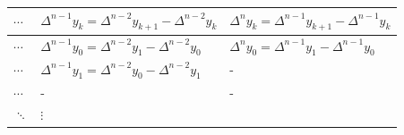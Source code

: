 \documentclass[]{book}
\begin{document}
\begin{longtable}[]{@{}lll@{}}
\toprule
\begin{minipage}[b]{0.07\columnwidth}\raggedright
\(\cdots\)\strut
\end{minipage} & \begin{minipage}[b]{0.43\columnwidth}\raggedright
\(\Delta^{n-1} y_k = \Delta^{n-2} y_{k+1} - \Delta^{n-2} y_k\)\strut
\end{minipage} & \begin{minipage}[b]{0.41\columnwidth}\raggedright
\(\Delta^{n} y_k = \Delta^{n-1} y_{k+1} - \Delta^{n-1} y_k\)\strut
\end{minipage}\tabularnewline
\midrule
\endhead
\begin{minipage}[t]{0.07\columnwidth}\raggedright
\(\cdots\)\strut
\end{minipage} & \begin{minipage}[t]{0.43\columnwidth}\raggedright
\(\Delta^{n-1} y_0 = \Delta^{n-2} y_{1} - \Delta^{n-2} y_0\)\strut
\end{minipage} & \begin{minipage}[t]{0.41\columnwidth}\raggedright
\(\Delta^{n} y_0 = \Delta^{n-1} y_{1} - \Delta^{n-1} y_0\)\strut
\end{minipage}\tabularnewline
\begin{minipage}[t]{0.07\columnwidth}\raggedright
\(\cdots\)\strut
\end{minipage} & \begin{minipage}[t]{0.43\columnwidth}\raggedright
\(\Delta^{n-1} y_1 = \Delta^{n-2} y_{0} - \Delta^{n-2} y_1\)\strut
\end{minipage} & \begin{minipage}[t]{0.41\columnwidth}\raggedright
-\strut
\end{minipage}\tabularnewline
\begin{minipage}[t]{0.07\columnwidth}\raggedright
\(\cdots\)\strut
\end{minipage} & \begin{minipage}[t]{0.43\columnwidth}\raggedright
-\strut
\end{minipage} & \begin{minipage}[t]{0.41\columnwidth}\raggedright
-\strut
\end{minipage}\tabularnewline
\begin{minipage}[t]{0.07\columnwidth}\raggedright
\(\ddots\)\strut
\end{minipage} & \begin{minipage}[t]{0.43\columnwidth}\raggedright
\(\vdots\)\strut

\end{minipage}
\end{longtable}
\end{document}
